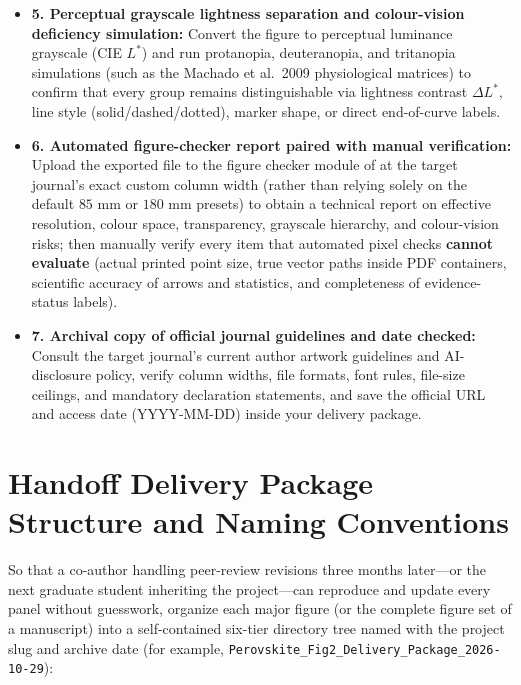\begin{itemize}
  \item[$\square$] \textbf{5. Perceptual grayscale lightness separation and colour-vision deficiency simulation:} Convert the figure to perceptual luminance grayscale (CIE $L^*$) and run protanopia, deuteranopia, and tritanopia simulations (such as the Machado et al.\ 2009 physiological matrices) to confirm that every group remains distinguishable via lightness contrast $\Delta L^*$, line style (solid/dashed/dotted), marker shape, or direct end-of-curve labels.
  \item[$\square$] \textbf{6. Automated figure-checker report paired with manual verification:} Upload the exported file to the figure checker module of \scidraw{} at the target journal's exact custom column width (rather than relying solely on the default $85\text{ mm}$ or $180\text{ mm}$ presets) to obtain a technical report on effective resolution, colour space, transparency, grayscale hierarchy, and colour-vision risks; then manually verify every item that automated pixel checks \textbf{cannot evaluate} (actual printed point size, true vector paths inside PDF containers, scientific accuracy of arrows and statistics, and completeness of evidence-status labels).
  \item[$\square$] \textbf{7. Archival copy of official journal guidelines and date checked:} Consult the target journal's current author artwork guidelines and AI-disclosure policy, verify column widths, file formats, font rules, file-size ceilings, and mandatory declaration statements, and save the official URL and access date (YYYY-MM-DD) inside your delivery package.
\end{itemize}

\section{Handoff Delivery Package Structure and Naming Conventions}

So that a co-author handling peer-review revisions three months later---or the next graduate student inheriting the project---can reproduce and update every panel without guesswork, organize each major figure (or the complete figure set of a manuscript) into a self-contained six-tier directory tree named with the project slug and archive date (for example, \texttt{Perovskite\_Fig2\_Delivery\_Package\_2026-10-29}):

